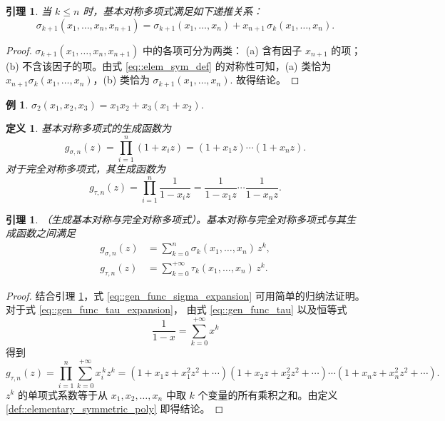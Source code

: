 \documentclass[a4paper]{ctexart}
\newtheorem{definition}[theorem]{定义} %
\newtheorem{lemma}[theorem]{引理}
\newtheorem{example}[theorem]{例}
\numberwithin{theorem}{section}
\numberwithin{equation}{section}
\numberwithin{figure}{section}
\numberwithin{remark}{section}
\begin{document}
\begin{lemma}
    \label{lem::elem_sym_recursion}
当 $k\le n$ 时，基本对称多项式满足如下递推关系：
\begin{equation}
\label{eq::elem_sym_rec}
\sigma_{k+1}(x_1,\ldots,x_n,x_{n+1})
=\sigma_{k+1}(x_1,\ldots,x_n)+x_{n+1}\,\sigma_k(x_1,\ldots,x_n).
\end{equation}
\end{lemma}

\begin{proof}
$\sigma_{k+1}(x_1,\ldots,x_n,x_{n+1})$ 中的各项可分为两类：
(a) 含有因子 $x_{n+1}$ 的项；
(b) 不含该因子的项。由式 \eqref{eq::elem_sym_def} 的对称性可知，(a) 类恰为 $x_{n+1}\sigma_k(x_1,\ldots,x_n)$，(b) 类恰为 $\sigma_{k+1}(x_1,\ldots,x_n)$. 故得结论。
\end{proof}

\begin{example}
    \label{ex::elem_sym_241}
$\sigma_2(x_1,x_2,x_3)=x_1x_2+x_3(x_1+x_2)$.
\end{example}

\begin{definition}
    \label{def::gen_func_elementary}
基本对称多项式的生成函数为
\begin{equation}
\label{eq::gen_func_sigma}
g_{\sigma,n}(z)=\prod_{i=1}^{n}(1+x_i z)=(1+x_1 z)\cdots(1+x_n z).
\end{equation}
对于完全对称多项式，其生成函数为
\begin{equation}
\label{eq::gen_func_tau}
g_{\tau,n}(z)=\prod_{i=1}^{n}\frac{1}{1-x_i z}
=\frac{1}{1-x_1 z}\cdots\frac{1}{1-x_n z}.
\end{equation}
\end{definition}

\begin{lemma}
    \label{lem::gen_elem_complete}
（生成基本对称与完全对称多项式）。基本对称与完全对称多项式与其生成函数之间满足
\begin{align}
    \label{eq::gen_func_sigma_expansion}
g_{\sigma,n}(z)&=\sum_{k=0}^{n}\sigma_k(x_1,\ldots,x_n)\,z^k,
\\
    \label{eq::gen_func_tau_expansion}
g_{\tau,n}(z)&=\sum_{k=0}^{+\infty}\tau_k(x_1,\ldots,x_n)\,z^k.
\end{align}
\end{lemma}

\begin{proof}
结合引理 \ref{lem::elem_sym_recursion}，式 \eqref{eq::gen_func_sigma_expansion} 可用简单的归纳法证明。对于式 \eqref{eq::gen_func_tau_expansion}，
由式 \eqref{eq::gen_func_tau} 以及恒等式
\begin{equation}
\label{eq::geom_series_identity}
\frac{1}{1-x}=\sum_{k=0}^{+\infty}x^k
\end{equation}
得到
\[
g_{\tau,n}(z)=\prod_{i=1}^{n}\sum_{k=0}^{+\infty}x_i^{\,k}z^{k}
=(1+x_1 z+x_1^{2}z^{2}+\cdots)(1+x_2 z+x_2^{2}z^{2}+\cdots)\cdots
(1+x_n z+x_n^{2}z^{2}+\cdots).
\]
$z^k$ 的单项式系数等于从 $x_1,x_2,\ldots,x_n$ 中取 $k$ 个变量的所有乘积之和。由定义 \ref{def::elementary_symmetric_poly} 即得结论。
\end{proof}
\end{document}
